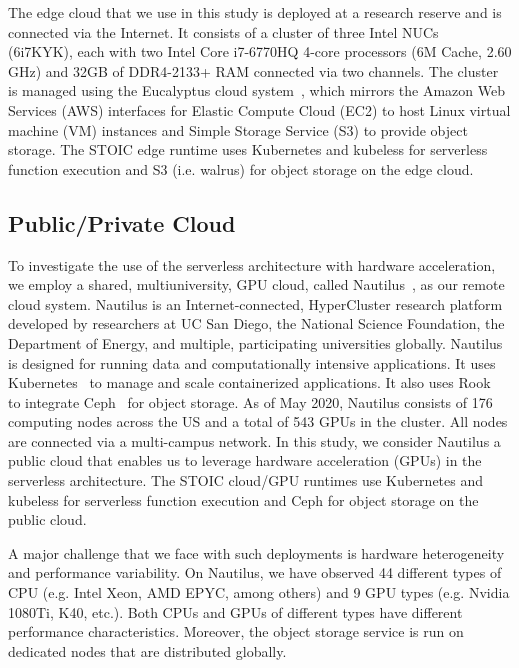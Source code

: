The edge cloud that we use in this study is deployed at a research reserve and is connected via the Internet.  It consists of a cluster of three Intel NUCs~\cite{ref:nucs} (6i7KYK), each with two Intel Core i7-6770HQ 4-core processors (6M Cache, 2.60 GHz) and 32GB of DDR4-2133+ RAM connected via two channels. The cluster is managed using the Eucalyptus cloud system~\cite{ref:euca}, which mirrors the Amazon Web Services (AWS) interfaces for Elastic Compute Cloud (EC2) to host Linux virtual machine (VM) instances and Simple Storage Service (S3) to provide object storage. The STOIC edge runtime uses Kubernetes and kubeless for serverless function execution and S3 (i.e. walrus) for object storage on the edge cloud.
 
\subsection{Public/Private Cloud}

To investigate the use of the serverless architecture with hardware acceleration, we employ a shared, multi\-university, GPU cloud, called Nautilus~\cite{ref:nautilus}, as our remote cloud system. Nautilus is an Internet-connected, HyperCluster research platform developed by researchers at UC San Diego, the National Science Foundation, the Department of Energy, and multiple, participating universities globally.  Nautilus is designed for running data and computationally intensive applications. It uses Kubernetes~\cite{ref:k8s} to manage and scale containerized applications. It also uses Rook~\cite{ref:rook} to integrate Ceph~\cite{ref:ceph} for object storage. As of May 2020, Nautilus consists of 176 computing nodes across the US and a total of 543 GPUs in the cluster. All nodes are connected via a multi-campus network. In this study, we consider Nautilus a public cloud that enables us to leverage hardware acceleration (GPUs) in the serverless architecture. The STOIC cloud/GPU runtimes use Kubernetes and kubeless for serverless function execution and Ceph for object storage on the public cloud.

A major challenge that we face with such deployments is hardware heterogeneity and performance variability. On Nautilus, we have observed 44 different types of CPU (e.g. Intel Xeon, AMD EPYC, among others) and 9 GPU types (e.g. Nvidia 1080Ti, K40, etc.). Both CPUs and GPUs of different types have different performance characteristics. Moreover, the object storage service is run on dedicated nodes that are distributed globally.

